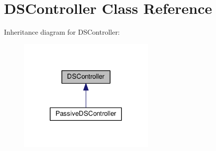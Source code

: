 \hypertarget{classDSController}{\section{D\+S\+Controller Class Reference}
\label{classDSController}
}


Inheritance diagram for D\+S\+Controller\+:\nopagebreak
\begin{figure}[H]
\begin{center}
\leavevmode
\includegraphics[width=188pt]{classDSController__inherit__graph}
\end{center}
\end{figure}
